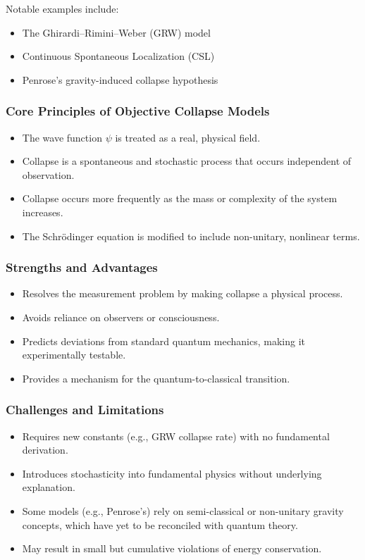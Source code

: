 \documentclass[12pt]{article}
\begin{document}
Notable examples include:
\begin{itemize}
    \item The Ghirardi–Rimini–Weber (GRW) model
    \item Continuous Spontaneous Localization (CSL)
    \item Penrose's gravity-induced collapse hypothesis
\end{itemize}

\subsubsection*{Core Principles of Objective Collapse Models}

\begin{itemize}
    \item The wave function \( \psi \) is treated as a real, physical field.
    \item Collapse is a spontaneous and stochastic process that occurs independent of observation.
    \item Collapse occurs more frequently as the mass or complexity of the system increases.
    \item The Schrödinger equation is modified to include non-unitary, nonlinear terms.
\end{itemize}

\subsubsection*{Strengths and Advantages}

\begin{itemize}
    \item Resolves the measurement problem by making collapse a physical process.
    \item Avoids reliance on observers or consciousness.
    \item Predicts deviations from standard quantum mechanics, making it experimentally testable.
    \item Provides a mechanism for the quantum-to-classical transition.
\end{itemize}

\subsubsection*{Challenges and Limitations}

\begin{itemize}
    \item Requires new constants (e.g., GRW collapse rate) with no fundamental derivation.
    \item Introduces stochasticity into fundamental physics without underlying explanation.
    \item Some models (e.g., Penrose's) rely on semi-classical or non-unitary gravity concepts, which have yet to be reconciled with quantum theory.
    \item May result in small but cumulative violations of energy conservation.
\end{itemize}
\end{document}
